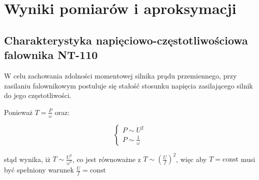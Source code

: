 \documentclass[12pt]{article}
\begin{document}
\section{Wyniki pomiarów i aproksymacji}

\subsection{Charakterystyka napięciowo-częstotliwościowa \\ falownika NT-110}

W celu zachowania zdolności momentowej silnika prądu przemiennego, przy
zasilaniu falownikowym postuluje się stałość stosunku napięcia zasilającego
silnik do jego częstotliwości.

Ponieważ $T= \frac{P}{\omega}$ oraz:

\begin{equation*}
	\begin{cases}
		P \sim U^2 \\
		P \sim \frac{1}{\omega}
	\end{cases}
\end{equation*}

stąd wynika, iż $T \sim \frac{U^2}{\omega^2}$, co jest równoważne z $T \sim
\left(\frac{U}{f}\right)^2$, więc aby $T=\text{const}$ musi być spełniony
warunek $\frac{U}{f} = \text{const}$
\end{document}

